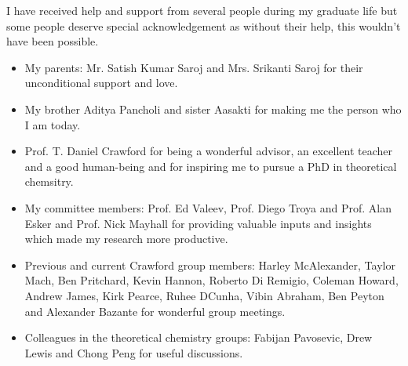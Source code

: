 I have received help and support from several people during my graduate life but
some people deserve special acknowledgement as without their help, this wouldn't have
been possible.
\begin{itemize}
\item {My parents: Mr. Satish Kumar Saroj and Mrs. Srikanti Saroj for their unconditional support and love.}
\item {My brother Aditya Pancholi and sister Aasakti for making me the person who I am today.}
\item {Prof. T. Daniel Crawford for being a wonderful advisor, an excellent teacher and a good human-being and for inspiring me to pursue a PhD in theoretical chemsitry.}
\item {My committee members: Prof. Ed Valeev, Prof. Diego Troya and Prof. Alan Esker and Prof. Nick Mayhall for providing
valuable inputs and insights which made my research more productive.}
\item{Previous and current Crawford group members: Harley McAlexander, Taylor Mach, Ben Pritchard, Kevin Hannon, Roberto Di Remigio, 
Coleman Howard, Andrew James, Kirk Pearce, Ruhee DCunha, Vibin Abraham, Ben Peyton and Alexander Bazante for wonderful group meetings.}
\item {Colleagues in the theoretical chemistry groups: Fabijan Pavosevic, Drew Lewis and Chong Peng for useful discussions.}
\end{itemize}
